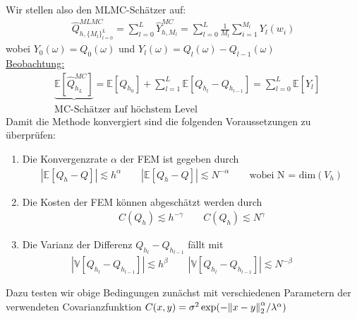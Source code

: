 Wir stellen also den MLMC-Schätzer auf:
\begin{align*}
     \hat{Q}^{MLMC}_{h,\{ M_l \}_{l=0}^{L}} = \sum_{l = 0}^{L} \hat{Y}_{h,M_l}^{MC} = \sum_{l=0}^{L} \frac{1}{M_l} \sum_{i=1}^{M_l} Y_l(w_i)
\end{align*} 
wobei $Y_0(\omega) = Q_0(\omega)$ und $Y_l(\omega) = Q_l(\omega) - Q_{l-1}(\omega)$ \\
\underline{Beobachtung:}
\begin{align*}
	&\underbrace{\mathbb{E}[\hat{Q}^{MC}_{h_L}]} = \mathbb{E}[Q_{h_0}]+ \sum_{l=1}^{L} \mathbb{E}[Q_{h_l}-Q_{h_{l-1}}] = \sum_{l=0}^{L} \mathbb{E}[\hat{Y}_l]\\
	&\text{MC-Schätzer auf höchstem Level}
\end{align*}
Damit die Methode konvergiert sind die folgenden Voraussetzungen zu überprüfen: 
\begin{enumerate}
	  \item Die Konvergenzrate $\alpha$ der FEM ist gegeben durch
		  \begin{align*}
		       |\mathbb{E}[Q_h-Q]| \lesssim h^{\alpha} \qquad |\mathbb{E}[Q_h-Q]| \lesssim N^{- \alpha} \qquad
		       \text{wobei N = dim} (V_h) 
		  \end{align*}
	\item Die Kosten der FEM können abgeschätzt werden durch 
		\begin{align*}
		    C(Q_h) \lesssim h^{-\gamma}  \qquad 
		    C(Q_h) \lesssim N^{\gamma}
		\end{align*}
	\item Die Varianz der Differenz $Q_{h_l} - Q_{h_{l-1}}$ fällt mit 
		\begin{align*}
			|\mathbb{V}[Q_{h_l}-Q_{h_{l-1}}]| \lesssim h^{\beta} \qquad 
			|\mathbb{V}[Q_{h_l}-Q_{h_{l-1}}]| \lesssim N^{- \beta} \qquad
		\end{align*}
\end{enumerate}
Dazu testen wir obige Bedingungen zunächst mit verschiedenen Parametern der verwendeten Covarianzfunktion $C(x,y)= \sigma^2 \exp ( - \norm{x-y}^{\alpha}_2 / \lambda^{\alpha})$
